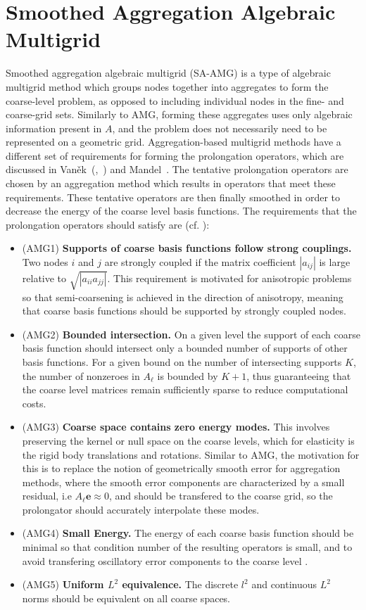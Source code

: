 \section{Smoothed Aggregation Algebraic Multigrid}
Smoothed aggregation algebraic multigrid (SA-AMG) is a type of algebraic multigrid method which groups nodes together into aggregates to form the coarse-level problem, as opposed to including individual nodes in the fine- and coarse-grid sets. Similarly to AMG, forming these aggregates uses only algebraic information present in $A$, and the problem does not necessarily need to be represented on a geometric grid. Aggregation-based multigrid methods have a different set of requirements for forming the prolongation operators, which are discussed in Van\v{e}k~(\cite{Vanek1996},~\cite{Vanek1996_unstruc}) and Mandel~\cite{Mandel1999}. The tentative prolongation operators are chosen by an aggregation method which results in operators that meet these requirements. These tentative operators are then finally smoothed in order to decrease the energy of the coarse level basis functions. The requirements that the prolongation operators should satisfy are (cf. \cite{Vanek1996_unstruc}):

\begin{itemize}
	\item (AMG1) \textbf{Supports of coarse basis functions follow strong couplings.} Two nodes $i$ and $j$ are strongly coupled if the matrix coefficient $|a_{ij}|$ is large relative to $\sqrt{|a_{ii}a_{jj}|}$. This requirement is motivated for anisotropic problems so that semi-coarsening is achieved in the direction of anisotropy, meaning that coarse basis functions should be supported by strongly coupled nodes.
	\item (AMG2) \textbf{Bounded intersection.} On a given level the support of each coarse basis function should intersect only a bounded number of supports of other basis functions. For a given bound on the number of intersecting supports $K$, the number of nonzeroes in $A_\ell$ is bounded by $K+1$, thus guaranteeing that the coarse level matrices remain sufficiently sparse to reduce computational costs.
	\item (AMG3) \textbf{Coarse space contains zero energy modes.} This involves preserving the kernel or null space on the coarse levels, which for elasticity is the rigid body translations and rotations. Similar to AMG, the motivation for this is to replace the notion of geometrically smooth error for aggregation methods, where the smooth error components are characterized by a small residual, i.e $A_\ell\mathbf{e} \approx 0$, and should be transfered to the coarse grid, so the prolongator should accurately interpolate these modes.
	\item (AMG4) \textbf{Small Energy.} The energy of each coarse basis function should be minimal so that condition number of the resulting operators is small, and to avoid transfering oscillatory error components to the coarse level \cite{Mandel1999}.
	\item (AMG5) \textbf{Uniform $L^2$ equivalence.} The discrete $l^2$ and continuous $L^2$ norms should be equivalent on all coarse spaces.
\end{itemize}

